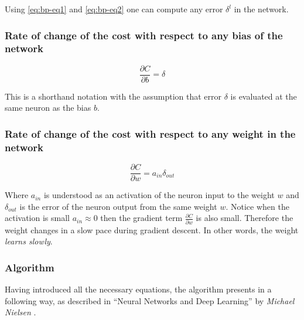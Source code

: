Using \ref{eq:bp-eq1} and \ref{eq:bp-eq2} one can compute any error $\delta^l$ in the network.

\subsubsection*{Rate of change of the cost with respect to any bias of the network}
\label{sub2:rate-of-change-of-the-cost-with-respect-to-every-bias-of-the-network}

\begin{equation}
    \frac{\partial C}{\partial b} = \delta
    \tag{EQ3}
    \label{eq:bp-eq3}
\end{equation}

This is a shorthand notation with the assumption that error $\delta$ is evaluated at the same neuron as the bias $b$.

\subsubsection*{Rate of change of the cost with respect to any weight in the network}
\label{sub2:rate-of-change-of-the-cost-with-respect-to-any-weight-in-the-network}

\begin{equation}
    \frac{\partial C}{\partial w} = a_{in} \delta_{out}
    \tag{EQ4}
    \label{eq:bp-eq4}
\end{equation}

Where $a_{in}$ is understood as an activation of the neuron input to the weight $w$ and $\delta_{out}$ is the error of the neuron output from the same weight $w$. Notice when the activation is small $a_{in} \approx 0$ then the gradient term $\frac{\partial C}{\partial w}$ is also small. Therefore the weight changes in a slow pace during gradient descent. In other words, the weight \emph{learns slowly}.


\subsubsection*{Algorithm}
\label{sub2:bp-algorithm}

Having introduced all the necessary equations, the algorithm presents in a following way, as described in ``Neural Networks and Deep Learning'' by \emph{Michael Nielsen} \cite{NNandDL}.


